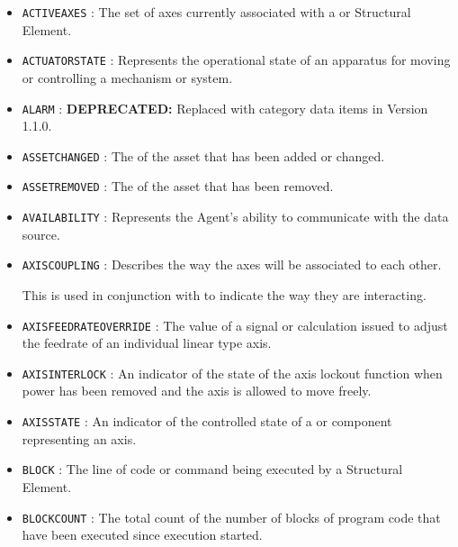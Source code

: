 \begin{itemize}

\item \texttt{ACTIVE\textunderscore AXES} : The set of axes currently associated with a  or  \gls{Structural Element}. 

\item \texttt{ACTUATOR\textunderscore STATE} : Represents the operational state of an apparatus for moving or controlling a mechanism or system. 

\item \texttt{ALARM} : \textbf{DEPRECATED:} Replaced with  category data items in Version 1.1.0. 

\item \texttt{ASSET\textunderscore CHANGED} : The  of the asset that has been added or changed. 

\item \texttt{ASSET\textunderscore REMOVED} : The  of the asset that has been removed. 

\item \texttt{AVAILABILITY} : Represents the \gls{Agent}'s ability to communicate with the data source. 

\item \texttt{AXIS\textunderscore COUPLING} : Describes the way the axes will be associated to each other. 
  
This is used in conjunction with  to indicate the way they are interacting. 

\item \texttt{AXIS\textunderscore FEEDRATE\textunderscore OVERRIDE} : The value of a signal or calculation issued to adjust the feedrate of an individual linear type axis. 

\item \texttt{AXIS\textunderscore INTERLOCK} : An indicator of the state of the axis lockout function when power has been removed and the axis is allowed to move freely. 

\item \texttt{AXIS\textunderscore STATE} : An indicator of the controlled state of a  or  component representing an axis. 

\item \texttt{BLOCK} : The line of code or command being executed by a  \gls{Structural Element}. 

\item \texttt{BLOCK\textunderscore COUNT} : The total count of the number of blocks of program code that have been executed since execution started. 


\end{itemize}
